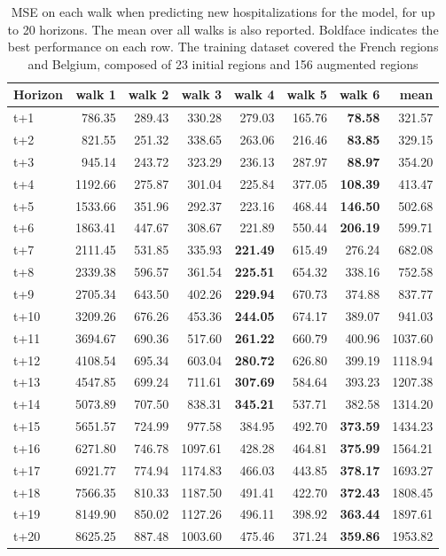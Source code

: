 \begin{table}[H]
\centering
\caption{MSE on each walk when predicting new hospitalizations for the model, for up to 20 horizons. The mean over all walks is also reported. Boldface indicates the best performance on each row. The training dataset covered the French regions and Belgium, composed of 23 initial regions and 156 augmented regions }
\label{tab:MSE_walk_encoder_decoder}
\begin{tabular}{lrrrrrrr}
\toprule
Horizon &  walk 1 &  walk 2 &  walk 3 &  walk 4 &  walk 5 &  walk 6 &    mean \\
\midrule
t+1  & 786.35  & 289.43  & 330.28  & 279.03  & 165.76  & \textbf{78.58}  & 321.57  \\
t+2  & 821.55  & 251.32  & 338.65  & 263.06  & 216.46  & \textbf{83.85}  & 329.15  \\
t+3  & 945.14  & 243.72  & 323.29  & 236.13  & 287.97  & \textbf{88.97}  & 354.20  \\
t+4  & 1192.66  & 275.87  & 301.04  & 225.84  & 377.05  & \textbf{108.39}  & 413.47  \\
t+5  & 1533.66  & 351.96  & 292.37  & 223.16  & 468.44  & \textbf{146.50}  & 502.68  \\
t+6  & 1863.41  & 447.67  & 308.67  & 221.89  & 550.44  & \textbf{206.19}  & 599.71  \\
t+7  & 2111.45  & 531.85  & 335.93  & \textbf{221.49}  & 615.49  & 276.24  & 682.08  \\
t+8  & 2339.38  & 596.57  & 361.54  & \textbf{225.51}  & 654.32  & 338.16  & 752.58  \\
t+9  & 2705.34  & 643.50  & 402.26  & \textbf{229.94}  & 670.73  & 374.88  & 837.77  \\
t+10  & 3209.26  & 676.26  & 453.36  & \textbf{244.05}  & 674.17  & 389.07  & 941.03  \\
t+11  & 3694.67  & 690.36  & 517.60  & \textbf{261.22}  & 660.79  & 400.96  & 1037.60  \\
t+12  & 4108.54  & 695.34  & 603.04  & \textbf{280.72}  & 626.80  & 399.19  & 1118.94  \\
t+13  & 4547.85  & 699.24  & 711.61  & \textbf{307.69}  & 584.64  & 393.23  & 1207.38  \\
t+14  & 5073.89  & 707.50  & 838.31  & \textbf{345.21}  & 537.71  & 382.58  & 1314.20  \\
t+15  & 5651.57  & 724.99  & 977.58  & 384.95  & 492.70  & \textbf{373.59}  & 1434.23  \\
t+16  & 6271.80  & 746.78  & 1097.61  & 428.28  & 464.81  & \textbf{375.99}  & 1564.21  \\
t+17  & 6921.77  & 774.94  & 1174.83  & 466.03  & 443.85  & \textbf{378.17}  & 1693.27  \\
t+18  & 7566.35  & 810.33  & 1187.50  & 491.41  & 422.70  & \textbf{372.43}  & 1808.45  \\
t+19  & 8149.90  & 850.02  & 1127.26  & 496.11  & 398.92  & \textbf{363.44}  & 1897.61  \\
t+20  & 8625.25  & 887.48  & 1003.60  & 475.46  & 371.24  & \textbf{359.86}  & 1953.82  \\

\bottomrule
\end{tabular}
\end{table}
